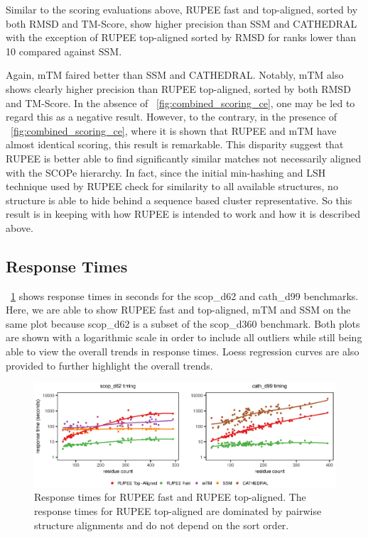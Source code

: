 \documentclass[letter,center,fleqn]{NAR}
\begin{document}
Similar to the scoring evaluations above, RUPEE fast and top-aligned, sorted by both RMSD and TM-Score, show higher precision than SSM and CATHEDRAL with the exception of RUPEE top-aligned sorted by RMSD for ranks lower than 10 compared against SSM. 

Again, mTM faired better than SSM and CATHEDRAL. 
Notably, mTM also shows clearly higher precision than RUPEE top-aligned, sorted by both RMSD and TM-Score. 
In the absence of \figurename~\ref{fig:combined_scoring_ce}, one may be led to regard this as a negative result. 
However, to the contrary, in the presence of \figurename~\ref{fig:combined_scoring_ce}, where it is shown that RUPEE and mTM have almost identical scoring, this result is remarkable. 
This disparity suggest that RUPEE is better able to find significantly similar matches not necessarily aligned with the SCOPe hierarchy. 
In fact, since the initial min-hashing and LSH technique used by RUPEE check for similarity to all available structures, no structure is able to hide behind a sequence based cluster representative. 
So this result is in keeping with how RUPEE is intended to work and how it is described above. 

\subsection{Response Times}

\figurename~\ref{fig:combined_response} shows response times in seconds for the scop\_d62 and cath\_d99 benchmarks. 
Here, we are able to show RUPEE fast and top-aligned, mTM and SSM on the same plot because scop\_d62 is a subset of the scop\_d360 benchmark. 
Both plots are shown with a logarithmic scale in order to include all outliers while still being able to view the overall trends in response times. 
Loess regression curves are also provided to further highlight the overall trends. 

\begin{figure}[tb]
\begin{center}
\includegraphics{combined_response}
\end{center}
\caption{Response times for RUPEE fast and RUPEE top-aligned. The response times for RUPEE top-aligned are dominated by pairwise structure alignments and do not depend on the sort order.}
\label{fig:combined_response}
\end{figure}
\end{document}
